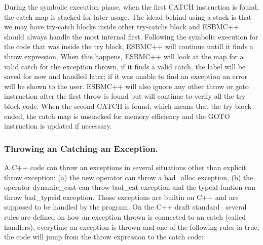 \documentclass[a4paper]{llncs}
\begin{document}
During the symbolic execution phase, when the first 
CATCH instruction is found, the catch map is stacked 
for later usage. The idead behind using a stack is 
that we may have try-catch blocks inside other 
try-catchs block and ESBMC++ should always handle 
the most internal first. Following the symbolic execution 
for the code that was inside the try block, ESBMC++ will continue 
untill it finds a throw expression. When this happens, ESBMC++ will 
look at the map for a valid catch for the exception thrown, if it finds 
a valid catch, the label will be saved for now and handled later; 
if it was unable to find an exception an error will be shown to the user. 
ESBMC++ will also ignore any other throw or goto instruction after 
the first throw is found but will continue to verify all the try 
block code. When the second CATCH is found, which means that the try 
block ended, the catch map is unstacked for memory efficiency 
and the GOTO instruction is updated if necessary.

\subsubsection{Throwing an Catching an Exception.}
A C++ code can throw an exceptions in several situations other than explicit throw exception: (a) the new operator can throw a bad\_alloc
exception, (b) the operator dynamic_cast can throw bad\_cat exception and the typeid funtion can throw bad\_typeid exception. Those 
exceptions are builtin on C++ and are supposed to be handled by the program.
On the C++ draft standard~\cite{CppDraft} several rules are defined on how an exception thrown is connected to an catch (called handlers),
everytime an exception is thrown and one of the following rules ia true, the code will jump from the throw expression to the catch code:
\end{document}
